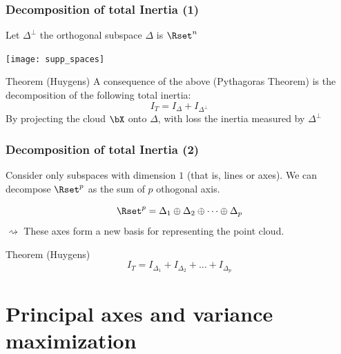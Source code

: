 \documentclass{beamer}\usepackage[]{graphicx}\usepackage[]{color}
\begin{document}
\begin{frame}
  \frametitle{Decomposition of total Inertia (1)}
  
  Let $\Delta^\bot$ the orthogonal subspace $\Delta$  is $\Rset^n$

  \texttt{[image: supp\_spaces]}

  \begin{block}{Theorem (Huygens)}
    A consequence of the above (Pythagoras Theorem) is the decomposition of the following total inertia:
      \begin{equation*}
        I_T = I_{\Delta} + I_{\Delta^\bot}
      \end{equation*}
    \alert{By projecting the cloud $\bX$ onto $\Delta$, with loss the inertia measured by $\Delta^\bot$}
    \end{block}
        
\end{frame}

\begin{frame}
  \frametitle{Decomposition of total Inertia (2)}
  
  Consider only subspaces with dimension $1$ (that is, lines or axes). We can decompose $\Rset^p$ as the sum of $p$ othogonal axis. 
  
  \begin{equation*}
    \Rset^p = \Delta_1 \oplus \Delta_2 \oplus \dots \oplus \Delta_p
  \end{equation*}
  \alert{$\rightsquigarrow$ These axes form a new basis for representing the point cloud.}

  \begin{block}{Theorem (Huygens)}
    \begin{equation*}
      I_{T} = I_{\Delta_1} + I_{\Delta_2} + \dots + I_{\Delta_p}
    \end{equation*}
  \end{block}
  
\end{frame}


\section{Principal axes and variance maximization}
\end{document}

